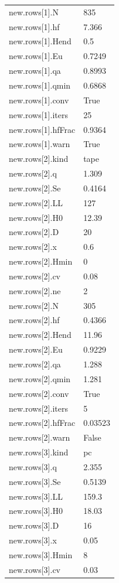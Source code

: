 {\begin{longtable}{p{}p{}}
{}new.rows[1].N & 835\\
{}new.rows[1].hf & 7.366\\
{}new.rows[1].Hend & 0.5\\
{}new.rows[1].Eu & 0.7249\\
{}new.rows[1].qa & 0.8993\\
{}new.rows[1].qmin & 0.6868\\
{}new.rows[1].conv & True\\
{}new.rows[1].iters & 25\\
{}new.rows[1].hfFrac & 0.9364\\
{}new.rows[1].warn & True\\
{}new.rows[2].kind & tape\\
{}new.rows[2].q & 1.309\\
{}new.rows[2].Se & 0.4164\\
{}new.rows[2].LL & 127\\
{}new.rows[2].H0 & 12.39\\
{}new.rows[2].D & 20\\
{}new.rows[2].x & 0.6\\
{}new.rows[2].Hmin & 0\\
{}new.rows[2].cv & 0.08\\
{}new.rows[2].ne & 2\\
{}new.rows[2].N & 305\\
{}new.rows[2].hf & 0.4366\\
{}new.rows[2].Hend & 11.96\\
{}new.rows[2].Eu & 0.9229\\
{}new.rows[2].qa & 1.288\\
{}new.rows[2].qmin & 1.281\\
{}new.rows[2].conv & True\\
{}new.rows[2].iters & 5\\
{}new.rows[2].hfFrac & 0.03523\\
{}new.rows[2].warn & False\\
{}new.rows[3].kind & pc\\
{}new.rows[3].q & 2.355\\
{}new.rows[3].Se & 0.5139\\
{}new.rows[3].LL & 159.3\\
{}new.rows[3].H0 & 18.03\\
{}new.rows[3].D & 16\\
{}new.rows[3].x & 0.05\\
{}new.rows[3].Hmin & 8\\
{}new.rows[3].cv & 0.03\\

\end{longtable}}
